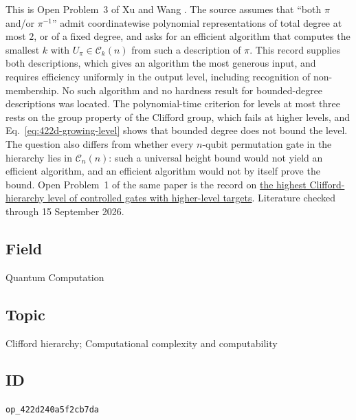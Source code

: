 This is Open Problem~3 of Xu and Wang .
The source assumes that ``both $\pi$ and/or $\pi^{-1}$'' admit coordinatewise
polynomial representations of total degree at most $2$, or of a fixed degree,
and asks for an efficient algorithm that computes the smallest $k$ with
$U_\pi\in\mathcal C_k(n)$ from such a description of $\pi$.  This record
supplies both descriptions, which gives an algorithm the most generous input,
and requires efficiency uniformly in the output level, including recognition
of non-membership.  No such algorithm and no hardness result for
bounded-degree descriptions was located.  The polynomial-time criterion for
levels at most three rests on the group property of the Clifford group, which
fails at higher levels, and Eq.~\eqref{eq:422d-growing-level} shows that
bounded degree does not bound the level.  The question also differs from
whether every $n$-qubit permutation gate in the hierarchy lies in
$\mathcal C_n(n)$: such a universal height bound would not yield an efficient
algorithm, and an efficient algorithm would not by itself prove the bound.
Open Problem~1 of the same paper is the record on
\href{https://qiqc-op.com/problem/op_e432fc5ff73e63be/}{the highest Clifford-hierarchy level of controlled gates with
higher-level targets}.
Literature checked through 15 September 2026.

\subsection*{Field}

Quantum Computation

\subsection*{Topic}

Clifford hierarchy; Computational complexity and computability

\subsection*{ID}

\texttt{op\_422d240a5f2cb7da}
